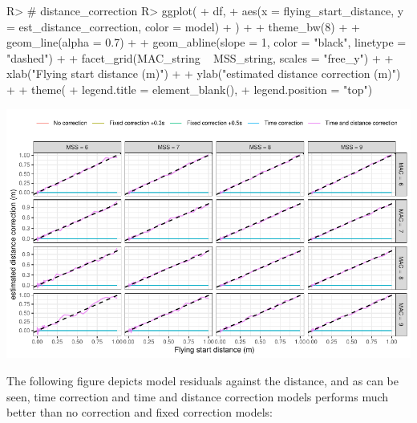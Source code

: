 \documentclass[
]{jss}
\begin{document}
\begin{CodeChunk}
\begin{CodeInput}
R> # distance_correction
R> ggplot(
+   df,
+   aes(x = flying_start_distance, y = est_distance_correction, color = model)
+ ) +
+   theme_bw(8) +
+   geom_line(alpha = 0.7) +
+   geom_abline(slope = 1, color = "black", linetype = "dashed") +
+   facet_grid(MAC_string ~ MSS_string, scales = "free_y") +
+   xlab("Flying start distance (m)") +
+   ylab("estimated distance correction (m)") +
+   theme(
+     legend.title = element_blank(),
+     legend.position = "top")
\end{CodeInput}


\begin{center}\includegraphics[width=1\linewidth]{paper_files/figure-latex/unnamed-chunk-36-1} \end{center}

\end{CodeChunk}

The following figure depicts model residuals against the distance, and as can be seen, time correction and time and distance correction models performs much better than no correction and fixed correction models:
\end{document}
